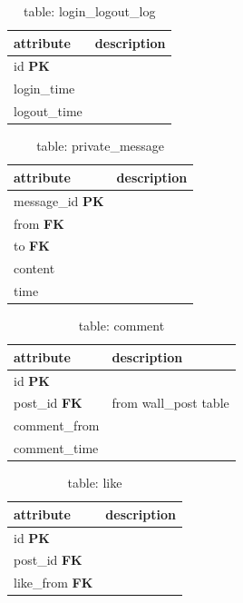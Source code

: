 \begin{table}[h]
    \centering
    \begin{tabular}{ll}
    attribute      & description\\ \hline
    id \textbf{PK} & \\
    login\_time    & \\
    logout\_time   & \\
    \end{tabular}
    \caption{table: login\_logout\_log}
\end{table}

\begin{table}[h]
    \centering
    \begin{tabular}{ll}
    attribute               & description\\ \hline
    message\_id \textbf{PK} & \\
    from \textbf{FK}        & \\
    to \textbf{FK}          & \\
    content                 & \\
    time                    & \\
    \end{tabular}
    \caption{table: private\_message}
\end{table}

\begin{table}[h]
    \centering
    \begin{tabular}{ll}
    attribute            & description\\ \hline
    id \textbf{PK}       & \\
    post\_id \textbf{FK} & from wall\_post table\\
    comment\_from        & \\
    comment\_time        & \\
    \end{tabular}
    \caption{table: comment}
\end{table}

\begin{table}[h]
    \centering
    \begin{tabular}{ll}
    attribute              & description\\ \hline
    id \textbf{PK}         & \\
    post\_id \textbf{FK}   & \\
    like\_from \textbf{FK} & \\
    \end{tabular}
    \caption{table: like}
\end{table}

